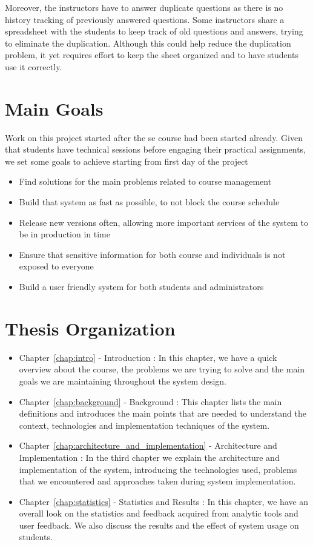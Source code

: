\newParagraph
Moreover, the instructors have to answer duplicate questions as there is no history tracking of previously answered questions. Some instructors share
a spreadsheet with the students to keep track of old questions and answers, trying to eliminate the duplication. Although this could help reduce the duplication
problem, it yet requires effort to keep the sheet organized and to have students use it correctly.

\section{Main Goals}
\label{sec:main-goals}
Work on this project started after the \ac{se} course had been started already. Given that students have technical sessions before
engaging their practical assignments, we set some goals to achieve starting from first day of the project
\begin{itemize}
  \item Find solutions for the main problems related to course management
  \item Build that system as fast as possible, to not block the course schedule
  \item Release new versions often, allowing more important services of the system to be in production in time
  \item Ensure that sensitive information for both course and individuals is not exposed to everyone
  \item Build a user friendly system for both students and administrators
\end{itemize}

\section{Thesis Organization}
\label{sec:thesis-organization}
\begin{itemize}
  \item Chapter~\ref{chap:intro} - Introduction : In this chapter, we have a quick overview about the course, the problems
  we are trying to solve and the main goals we are maintaining throughout the system design.
  \item Chapter~\ref{chap:background} - Background : This chapter lists the main definitions and introduces the main points that
  are needed to understand the context, technologies and implementation techniques of the system.
  \item Chapter~\ref{chap:architecture_and_implementation} - Architecture and Implementation : In the third chapter we explain the architecture
  and implementation of the system, introducing the technologies used, problems that we encountered and approaches taken during system implementation.
  \item Chapter~\ref{chap:statistics} - Statistics and Results : In this chapter, we have an overall look on the statistics and feedback
  acquired from analytic tools and user feedback. We also discuss the results and the effect of system usage on students.
\end{itemize}
